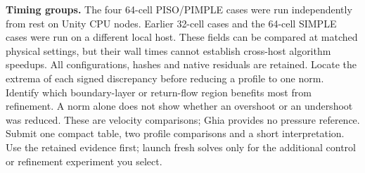 \textbf{Timing groups.} The four 64-cell PISO/PIMPLE cases were run independently
from rest on Unity CPU nodes. Earlier 32-cell cases and the 64-cell SIMPLE
cases were run on a different local host. These fields can be compared at
matched physical settings, but their wall times cannot establish cross-host
algorithm speedups. All configurations, hashes and native residuals are retained.
\newpage
{}
Locate the extrema of each signed discrepancy before reducing a profile to one
norm. Identify which boundary-layer or return-flow region benefits most from
refinement. A norm alone does not show whether an overshoot or an undershoot was
reduced. These are velocity comparisons; Ghia provides no pressure reference.
\newpage
{}
Submit one compact table, two profile comparisons and a short interpretation.
Use the retained evidence first; launch fresh solves only for the additional
control or refinement experiment you select.
